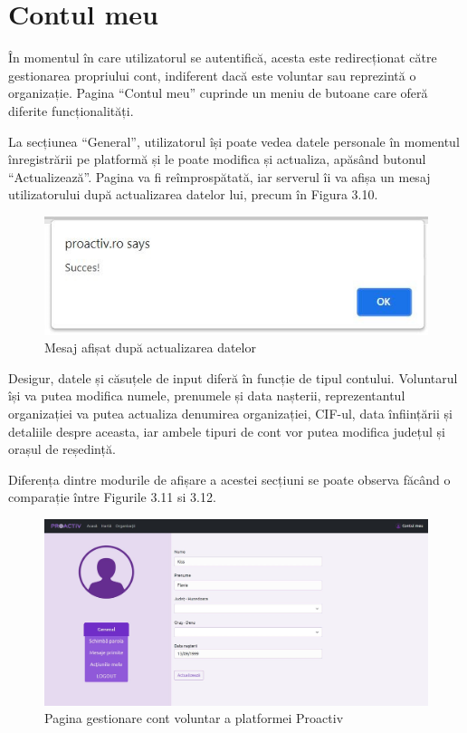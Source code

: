 \documentclass[12pt,a4paper]{report}
\begin{document}
\section{Contul meu}
\par
În momentul în care utilizatorul se autentifică, acesta este redirecționat către gestionarea propriului cont, indiferent dacă este voluntar sau reprezintă o organizație. Pagina “Contul meu” cuprinde un meniu de butoane care oferă diferite funcționalități. 
\\\par
La secțiunea “General”, utilizatorul își poate vedea datele personale în momentul înregistrării pe platformă și le poate modifica și actualiza, apăsând butonul “Actualizează”. Pagina va fi reîmprospătată, iar serverul îi va afișa un mesaj utilizatorului după actualizarea datelor lui, precum în Figura 3.10.
\\
\begin{figure}[H]
\centering
  \includegraphics[width=0.5\linewidth]{./imagini/succes.jpg}
  \caption{Mesaj afișat după actualizarea datelor}
\end{figure}
\par
Desigur, datele și căsuțele de input diferă în funcție de tipul contului. Voluntarul își va putea modifica numele, prenumele și data nașterii, reprezentantul organizației va putea actualiza denumirea organizației, CIF-ul, data înființării și detaliile despre aceasta, iar ambele tipuri de cont vor putea modifica județul și orașul de reședință.
\\\par
Diferența dintre modurile de afișare a acestei secțiuni se poate observa făcând o comparație între Figurile 3.11 si 3.12.
\\
\begin{figure}[H]
\centering
  \includegraphics[width=1\linewidth]{./imagini/cont1.jpg}
  \caption{Pagina gestionare cont voluntar a platformei Proactiv}
\end{figure}
\end{document}
